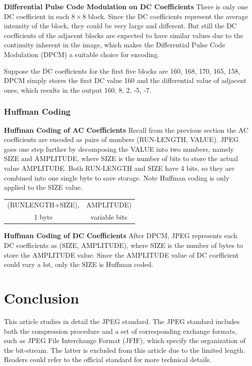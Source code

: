 \documentclass[11pt]{article}
\begin{document}
\textbf{Differential Pulse Code Modulation on DC Coefficients} There is only one DC coefficient in each $8\times8$ block. Since the DC coefficients represent the average intensity of the block, they could be very large and different. But still the DC coefficients of the adjacent blocks are expected to have similar values due to the continuity inherent in the image, which makes the Differential Pulse Code Modulation (DPCM) a suitable choice for encoding.

Suppose the DC coefficients for the first five blocks are 160, 168, 170, 165, 158, DPCM simply stores the first DC value 160 and the differential value of adjacent ones, which results in the output 160, 8, 2, -5, -7.

\subsubsection{Huffman Coding}
\textbf{Huffman Coding of AC Coefficients} Recall from the previous section the AC coefficients are encoded as pairs of numbers (RUN-LENGTH, VALUE). JPEG goes one step further by decomposing the VALUE into two numbers, namely SIZE and AMPLITUDE, where SIZE is the number of bits to store the actual value AMPLITUDE. Both RUN-LENGTH and SIZE have 4 bits, so they are combined into one single byte to save storage. Note Huffman coding is only applied to the SIZE value.

\begin{tabular}{cc}
(RUNLENGTH+SIZE), & AMPLITUDE) \\
 1 byte & variable bits \\
\end{tabular}

\textbf{Huffman Coding of DC Coefficients} After DPCM, JPEG represents each DC coefficients as (SIZE, AMPLITUDE), where SIZE is the number of bytes to store the AMPLITUDE value. Since the AMPLITUDE value of DC coefficient could vary a lot, only the SIZE is Huffman coded.

\section{Conclusion}\label{conclusion}
This article studies in detail the JPEG standard. The JPEG standard includes both the compression procedure and a set of corresponding exchange formats, such as JPEG File Interchange Format (JFIF), which specify the organization of the bit-stream. The latter is excluded from this article due to the limited length. Readers could refer to the official standard for more technical details.


\end{document}
